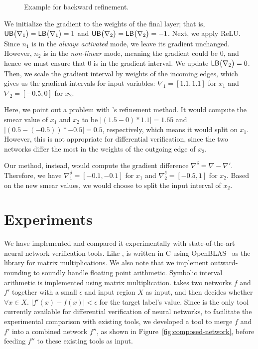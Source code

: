 \begin{figure}
	\centering
	\scalebox{1.0}{
	
	}
	\caption{Example for backward refinement.\label{fig:refine_ex}}
\end{figure}


We initialize the gradient to the weights of the final layer; that is,
$ \mathsf{UB}\big(\nabla_1\big) = \mathsf{LB}\big(\nabla_1\big) = 1 $ and $ \mathsf{UB}\big(\nabla_2\big)
= \mathsf{LB}\big(\nabla_2\big) = -1 $.
%
Next, we apply ReLU. Since $ n_1 $ is in the \emph{always activated}
mode, we leave its gradient unchanged. However, $ n_2 $ is in
the \emph{non-linear} mode, meaning the gradient could be 0, and hence
we must ensure that 0 is in the gradient interval.  We update
$ \mathsf{LB}\big(\nabla_2\big) = 0 $.
%
Then, we scale the gradient interval by weights of the incoming edges,
which gives us the gradient intervals for input variables: $ \nabla_1
= [1.1, 1.1] $ for $x_1$ and $ \nabla_2 = [-0.5, 0] $ for $x_2$.


Here, we point out a problem with \ReluVal{}'s refinement method.  It
would compute the smear value of $ x_1 $ and $ x_2 $ to be $ |(1.5
- 0)*1.1| = 1.65 $ and $ |(0.5 - (-0.5))*-0.5| = 0.5 $, respectively,
which means it would split on $ x_1 $.  However, this is not appropriate for
differential verification, since the two networks differ the most in
the weights of the outgoing edge of $x_2$.


Our method, instead, would compute the gradient difference
$\nabla^\delta = \nabla - \nabla'$.  Therefore, we have
$\nabla^\delta_1 = [-0.1, -0.1]$ for $ x_1 $ and $ \nabla^\delta_2 =
[-0.5, 1] $ for $ x_2 $.  Based on the new smear values, we would
choose to split the input interval of $x_2$.



\section{Experiments}
\label{sec:experiment}

We have implemented \diffNN{} and compared it experimentally with
state-of-the-art neural network verification tools.  Like \ReluVal,
\diffNN{} is written in C using OpenBLAS~\cite{ZhangWZ12} as the
library for matrix multiplications. We also note that we implement outward-rounding to soundly handle floating point arithmetic. Symbolic interval arithmetic is
implemented using matrix multiplication.  \diffNN{} takes two
networks $f$ and $f'$ together with a small $\epsilon$ and input
region $ X $ as input, and then decides whether $\forall
x \in X$. $|f'(x)-f(x)|<\epsilon$ for the target label's value.
%
Since \diffNN{} is the only tool currently available for differential
verification of neural networks, to facilitate the experimental
comparison with existing tools, we developed a tool to
merge $f$ and $f'$ into a combined network $f''$, as shown in
Figure~\ref{fig:composed-network}, before feeding $f''$ to these existing
tools as input.


